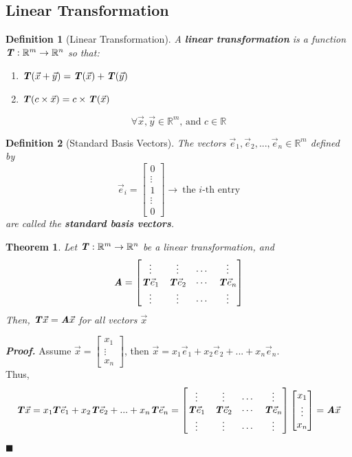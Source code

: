 \documentclass[12pt, a4paper]{article}
\newtheorem{thm}{Theorem}[subsection]
\newtheorem{df}{Definition}[subsection]
\newenvironment*{prf}{\indent\textbf{\textit{Proof. }}}{\hfill $\blacksquare$\par}
\def\R{{\mathbb{R}}}
\def\T{{\textbf{\emph{T}}}}
\def\vecx{\vec{x}}
\def\vece{\vec{e}}
\def\matrixA{\textbf{\emph{A}}}
\begin{document}
\subsection{Linear Transformation}
\begin{df}[Linear Transformation]
A \textbf{linear transformation} is a function $\T: \R^m\rightarrow\R^n$ so that:
\begin{enumerate}
\item $\T(\vec{x}+\vec{y})=\T(\vec{x})+\T(\vec{y})$
\item $\T(c\times \vec{x})=c\times\T(\vec{x})$
\end{enumerate}
$$\forall \vec{x},\vec{y}\in \R^m\text{, and }c\in\R$$
\end{df}

\begin{df}[Standard Basis Vectors]
The vectors $\vece_1,\vece_2,...,\vece_n \in \R^m$ defined by 
$$\vece_i=\begin{bmatrix}0\\\vdots\\1\\\vdots\\0\end{bmatrix} \rightarrow \ \text{the }i\text{-th entry}$$ are called the \textbf{standard basis vectors}.
\end{df}

\begin{thm}
Let $\T: \R^m\rightarrow\R^n$ be a linear transformation, and $$\matrixA=\begin{bmatrix}\vdots&\vdots&\cdots&\vdots\\\T \vece_1&\T \vece_2&\cdots&\T \vece_n\\\vdots&\vdots&\cdots&\vdots\end{bmatrix}$$ Then, $\T\vecx=\matrixA\vecx$ for all vectors $\vecx$
\end{thm}

\begin{prf}
Assume $\vec{x}=\begin{bmatrix}x_1\\\vdots\\x_n\end{bmatrix}$, then $\vec{x}=x_1\vece_1+x_2\vece_2+...+x_n\vece_n$.\\Thus, $$\T\vec{x}=x_1\boldsymbol{T}\vece_1+x_2\T \vece_2+...+x_n\T \vece_n= \begin{bmatrix}\vdots&\vdots&\cdots&\vdots\\\T{\vece_1}&\T{\vece_2}&\cdots&\T{\vece_n}\\\vdots&\vdots&\cdots&\vdots\end{bmatrix}\begin{bmatrix}x_1\\\vdots\\x_n\end{bmatrix}=\matrixA\vec{x}$$
\end{prf}
\end{document}
